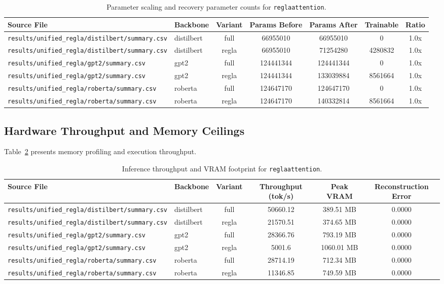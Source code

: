\begin{table}[t]
\centering
\small
\begin{tabular}{llccccc}
\toprule
\textbf{Source File} & \textbf{Backbone} & \textbf{Variant} & \textbf{Params Before} & \textbf{Params After} & \textbf{Trainable} & \textbf{Ratio} \\
\midrule
\texttt{results/unified\_regla/distilbert/summary.csv} & distilbert & full & 66955010 & 66955010 & 0 & 1.0x \\
\texttt{results/unified\_regla/distilbert/summary.csv} & distilbert & regla & 66955010 & 71254280 & 4280832 & 1.0x \\
\texttt{results/unified\_regla/gpt2/summary.csv} & gpt2 & full & 124441344 & 124441344 & 0 & 1.0x \\
\texttt{results/unified\_regla/gpt2/summary.csv} & gpt2 & regla & 124441344 & 133039884 & 8561664 & 1.0x \\
\texttt{results/unified\_regla/roberta/summary.csv} & roberta & full & 124647170 & 124647170 & 0 & 1.0x \\
\texttt{results/unified\_regla/roberta/summary.csv} & roberta & regla & 124647170 & 140332814 & 8561664 & 1.0x \\
\bottomrule
\end{tabular}
\caption{Parameter scaling and recovery parameter counts for \texttt{reglaattention}.}
\label{tab:results_params_reglaattention}
\end{table}

\subsection{Hardware Throughput and Memory Ceilings}
Table~\ref{tab:results_vram_reglaattention} presents memory profiling and execution throughput.

\begin{table}[t]
\centering
\small
\begin{tabular}{llcccc}
\toprule
\textbf{Source File} & \textbf{Backbone} & \textbf{Variant} & \textbf{Throughput (tok/s)} & \textbf{Peak VRAM} & \textbf{Reconstruction Error} \\
\midrule
\texttt{results/unified\_regla/distilbert/summary.csv} & distilbert & full & 50660.12 & 389.51 MB & 0.0000 \\
\texttt{results/unified\_regla/distilbert/summary.csv} & distilbert & regla & 21570.51 & 374.65 MB & 0.0000 \\
\texttt{results/unified\_regla/gpt2/summary.csv} & gpt2 & full & 28366.76 & 793.19 MB & 0.0000 \\
\texttt{results/unified\_regla/gpt2/summary.csv} & gpt2 & regla & 5001.6 & 1060.01 MB & 0.0000 \\
\texttt{results/unified\_regla/roberta/summary.csv} & roberta & full & 28714.19 & 712.34 MB & 0.0000 \\
\texttt{results/unified\_regla/roberta/summary.csv} & roberta & regla & 11346.85 & 749.59 MB & 0.0000 \\
\bottomrule
\end{tabular}
\caption{Inference throughput and VRAM footprint for \texttt{reglaattention}.}
\label{tab:results_vram_reglaattention}
\end{table}


